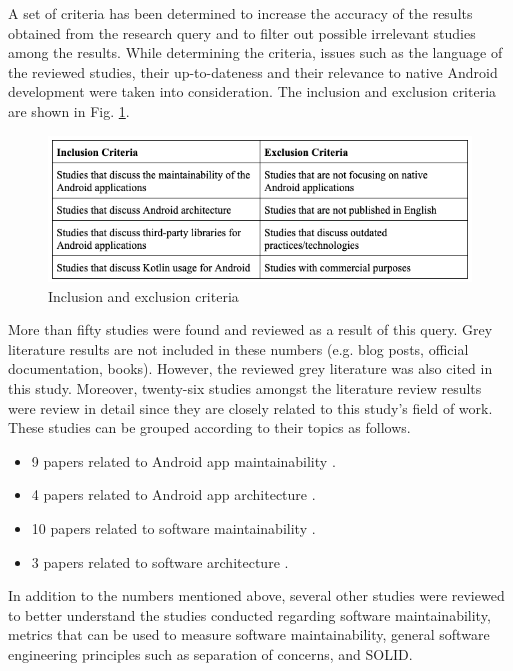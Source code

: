 A set of criteria has been determined to increase the accuracy of the results obtained from the research query and to filter out possible irrelevant studies among the results. While determining the criteria, issues such as the language of the reviewed studies, their up-to-dateness and their relevance to native Android development were taken into consideration. The inclusion and exclusion criteria are shown in Fig. \ref{fig:lit_review_research_query_criteria}.

\begin{figure}[ht!]
    \centering
    \includegraphics[scale=0.5]{figures/research_query_criteria.png}
    \caption{Inclusion and exclusion criteria}
    \label{fig:lit_review_research_query_criteria}
\end{figure}
\FloatBarrier

More than fifty studies were found and reviewed as a result of this query. Grey literature results are not included in these numbers (e.g. blog posts, official documentation, books). However, the reviewed grey literature was also cited in this study. Moreover, twenty-six studies amongst the literature review results were review in detail since they are closely related to this study's field of work. These studies can be grouped according to their topics as follows.
\begin{itemize}
    \item 9 papers related to Android app maintainability \cite{34,50,52,2,18,19,43,44,53}.
    \item 4 papers related to Android app architecture \cite{56,14,47,48}.
    \item 10 papers related to software maintainability \cite{23,26,33,36,45,4,22,35,46,49}.
    \item 3 papers related to software architecture \cite{25,27,28,}.
\end{itemize}

In addition to the numbers mentioned above, several other studies were reviewed to better understand the studies conducted regarding software maintainability, metrics that can be used to measure software maintainability, general software engineering principles such as separation of concerns, and SOLID.

